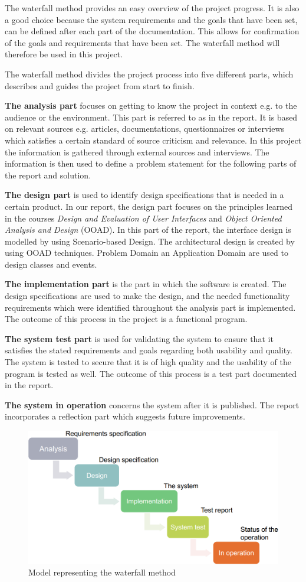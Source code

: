 The waterfall method provides an easy overview of the project progress. It is also a good choice because the system requirements and the goals that have been set, can be defined after each part of the documentation. This allows for confirmation of the goals and requirements that have been set. The waterfall method will therefore be used in this project.       

The waterfall method divides the project process into five different parts, which describes and guides the project from start to finish.

\textbf{The analysis part} focuses on getting to know the project in context e.g. to the audience or the environment. This part is referred to as \textit{} in the report. It is based on relevant sources e.g. articles, documentations, questionnaires or interviews which satisfies a certain standard of source criticism and relevance. In this project the information is gathered through external sources and interviews. The information is then used to define a problem statement for the following parts of the report and solution.

\textbf{The design part} is used to identify design specifications that is needed in a certain product. In our report, the design part focuses on the principles learned in the courses \textit{Design and Evaluation of User Interfaces} and \textit{Object Oriented Analysis and Design} (OOAD). In this part of the report, the interface design is modelled by using Scenario-based Design. The architectural design is created by using OOAD techniques. Problem Domain an Application Domain are used to design classes and events.

\textbf{The implementation part} is the part in which the software is created. The design specifications are used to make the design, and the needed functionality requirements which were identified throughout the analysis part is implemented. The outcome of this process in the project is a functional program.

\textbf{The system test part} is used for validating the system to ensure that it satisfies the stated requirements and goals regarding both usability and quality. The system is tested to secure that it is of high quality and the usability of the program is tested as well. The outcome of this process is a test part documented in the report.

\textbf{The system in operation} concerns the system after it is published. The report incorporates a reflection part which suggests future improvements.

\begin{figure}[H]
\includegraphics[width=\linewidth, clip=true]{Grafik/FoodPlanner/Waterfall}
\centering
\caption{Model representing the waterfall method}
\end{figure}